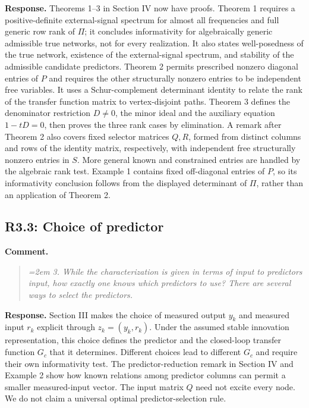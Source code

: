 \documentclass[11pt]{article}
\begin{document}
\textbf{Response.} Theorems 1--3 in Section IV now have proofs. Theorem 1
requires a positive-definite external-signal spectrum for almost all
frequencies and full generic row rank of $\Pi$; it concludes informativity
for algebraically generic admissible true networks, not for every realization.
It also states well-posedness of the true network, existence of the
external-signal spectrum, and stability of the admissible candidate predictors.
Theorem 2 permits prescribed nonzero diagonal entries of $P$ and requires
the other structurally nonzero entries to be independent free variables. It uses a
Schur-complement determinant identity to relate the rank of the transfer function matrix
to vertex-disjoint paths. Theorem 3 defines the denominator restriction
$D\ne0$, the minor ideal and the auxiliary equation $1-tD=0$, then proves
the three rank cases by elimination. A remark after Theorem 2 also covers
fixed selector matrices $Q,R$, formed from distinct columns and rows of
the identity matrix, respectively, with independent free structurally
nonzero entries in $S$.
More general known and constrained entries are handled by the algebraic rank test.
Example 1 contains fixed off-diagonal entries of $P$, so its informativity conclusion follows
from the displayed determinant of $\Pi$, rather than an application of
Theorem 2.

\subsection*{R3.3: Choice of predictor}
\textbf{Comment.}
\begin{quote}\itshape\emergencystretch=2em
3. While the characterization is given in terms of input to predictors input, how exactly one knows which predictors to use? There are several ways to select the predictors.
\end{quote}

\textbf{Response.} Section III makes the choice of measured output $y_k$
and measured input $r_k$ explicit through $z_k=(y_k,r_k)$. Under the assumed
stable innovation representation, this choice defines the predictor and the
closed-loop transfer function $G_c$ that it determines. Different choices
lead to different $G_c$ and require their own informativity test. The
predictor-reduction remark in Section IV and Example 2 show how known
relations among predictor columns can permit a smaller measured-input
vector. The input matrix $Q$ need not excite every node. We do not claim
a universal optimal predictor-selection rule.
\end{document}
